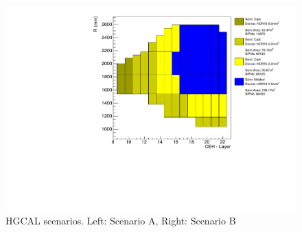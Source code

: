 \begin{figure}[!ht]
\begin{minipage}[c]{0.49\textwidth}
  \end{minipage}
  \begin{minipage}[c]{0.49\textwidth}
    \includegraphics[trim={0 0 165pt 0},clip,width=\textwidth]{figures/hgcal/plot_scenes/sceneB_jan20_fix_vto2p0_with9mm2.pdf}
  \end{minipage}
  \caption[\gls{HGCAL} scenarios]{\gls{HGCAL} scenarios. Left: Scenario A, Right: Scenario B}%
  \label{fig:hgcal-scenes-fnal-jan20}
\end{figure}

